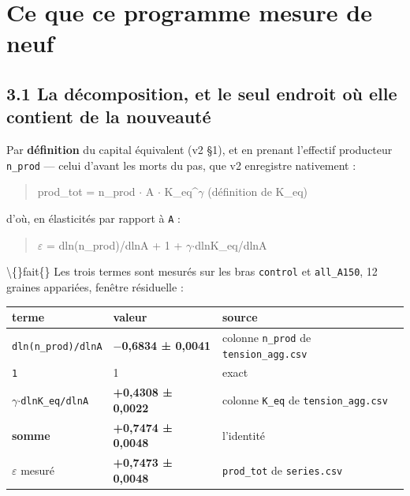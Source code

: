 \documentclass[11pt,a4paper]{article}
\newcommand{\code}[1]{\texttt{#1}}
\begin{document}
\bigskip

\setcounter{section}{2}
\section{Ce que ce programme mesure de neuf}

\subsection*{3.1 La décomposition, et le seul endroit où elle contient de la nouveauté}

Par \textbf{définition} du capital équivalent (v2 §1), et en prenant l'effectif producteur \code{n\_prod} --- celui d'avant les morts du pas, que v2 enregistre nativement :

\begin{quote}\ttfamily\footnotesize\obeylines
prod\_tot = n\_prod \ensuremath{\cdot} A \ensuremath{\cdot} K\_eq\textasciicircum{}\ensuremath{\gamma}        (définition de K\_eq)
\end{quote}

d'où, en élasticités par rapport à \code{A} :

\begin{quote}\ttfamily\footnotesize\obeylines
\ensuremath{\varepsilon} = dln(n\_prod)/dlnA  +  1  +  \ensuremath{\gamma}\ensuremath{\cdot}dlnK\_eq/dlnA
\end{quote}

\textbackslash\{\}fait\{\} Les trois termes sont mesurés sur les bras \code{control} et \code{all\_A150}, 12 graines appariées, fenêtre résiduelle :

\begin{center}
\begin{tabularx}{\linewidth}{@{}llX@{}}
\toprule
\textbf{terme} & \textbf{valeur} & \textbf{source} \\
\midrule
\code{dln(n\_prod)/dlnA} & \textbf{\ensuremath{-}0,6834 ± 0,0041} & colonne \code{n\_prod} de \code{tension\_agg.csv} \\
\code{1} & 1 & exact \\
\code{\ensuremath{\gamma}\ensuremath{\cdot}dlnK\_eq/dlnA} & \textbf{+0,4308 ± 0,0022} & colonne \code{K\_eq} de \code{tension\_agg.csv} \\
\textbf{somme} & \textbf{+0,7474 ± 0,0048} & l'identité \\
\ensuremath{\varepsilon} mesuré & \textbf{+0,7473 ± 0,0048} & \code{prod\_tot} de \code{series.csv} \\
\bottomrule
\end{tabularx}
\end{center}
\end{document}

